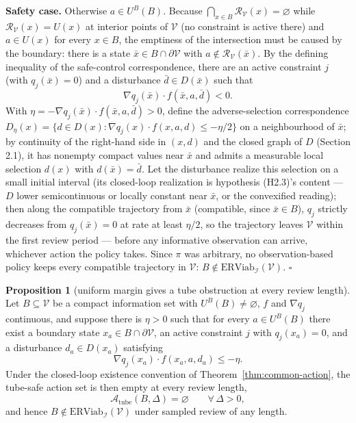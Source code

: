 \documentclass[11pt]{article}
\theoremstyle{definition}
\newtheorem{proposition}{Proposition}
\begin{document}
\textbf{Safety case.} Otherwise \(a \in U^B(B)\). Because
\(\bigcap_{x \in B} \mathcal{R}_{\mathcal{V}}(x) = \varnothing\) while
\(\mathcal{R}_{\mathcal{V}}(x) = U(x)\) at interior points of
\(\mathcal{V}\) (no constraint is active there) and \(a \in U(x)\) for
every \(x \in B\), the emptiness of the intersection must be caused by
the boundary: there is a state
\(\bar x \in B \cap \partial \mathcal{V}\) with
\(a \notin \mathcal{R}_{\mathcal{V}}(\bar x)\). By the defining
inequality of the safe-control correspondence, there are an active
constraint \(j\) (with \(q_j(\bar x) = 0\)) and a disturbance
\(\bar d \in D(\bar x)\) such that
\[\nabla q_j(\bar x) \cdot f(\bar x, a, \bar d) < 0.\] With
\(\eta = - \nabla q_j(\bar x) \cdot f(\bar x, a, \bar d) > 0\), define
the adverse-selection correspondence
\(D_{\eta}(x) = \{ d \in D(x) : \nabla q_j(x) \cdot f(x, a, d) \le -\eta/2 \}\)
on a neighbourhood of \(\bar x\); by continuity of the right-hand side
in \((x,d)\) and the closed graph of \(D\) (Section 2.1), it has
nonempty compact values near \(\bar x\) and admits a measurable local
selection \(d(x)\) with \(d(\bar x) = \bar d\). Let the disturbance
realize this selection on a small initial interval (its closed-loop
realization is hypothesis (H2.3)'s content --- \(D\) lower
semicontinuous or locally constant near \(\bar x\), or the convexified
reading); then along the compatible trajectory from \(\bar x\)
(compatible, since \(\bar x \in B\)), \(q_j\) strictly decreases from
\(q_j(\bar x) = 0\) at rate at least \(\eta/2\), so the trajectory
leaves \(\mathcal{V}\) within the first review period --- before any
informative observation can arrive, whichever action the policy takes.
Since \(\pi\) was arbitrary, no observation-based policy keeps every
compatible trajectory in \(\mathcal{V}\):
\(B \notin \mathrm{ERViab}_{\mathcal{I}}(\mathcal{V})\). \ensuremath{\square}

\begin{proposition}[uniform margin gives a tube obstruction at every review length]\label{prop:uniform-margin}
Let \(B\subseteq\mathcal V\) be a compact information set with
\(U^B(B)\neq\varnothing\), \(f\) and \(\nabla q_j\) continuous, and
suppose there is \(\eta>0\) such that for every \(a\in U^B(B)\) there
exist a boundary state \(x_a\in B\cap\partial\mathcal V\), an active
constraint \(j\) with \(q_j(x_a)=0\), and a disturbance \(d_a\in D(x_a)\)
satisfying
\[\nabla q_j(x_a)\cdot f(x_a,a,d_a) \le -\eta.\]
Under the closed-loop existence convention of
Theorem~\ref{thm:common-action}, the tube-safe action set is then empty
at every review length,
\[\mathcal{A}_{\mathrm{tube}}(B,\Delta)=\varnothing \qquad \forall\,\Delta>0,\]
and hence \(B\notin\mathrm{ERViab}_{\mathcal I}(\mathcal V)\) under
sampled review of any length.
\end{proposition}
\end{document}

